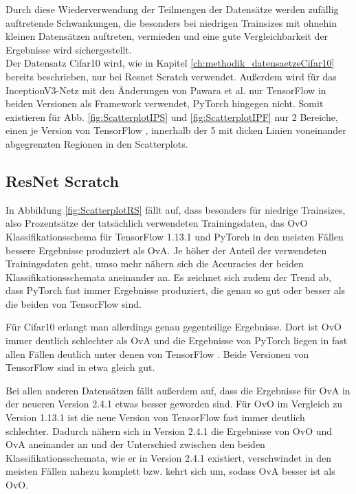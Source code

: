 Durch diese Wiederverwendung der Teilmengen der Datensätze werden zufällig auftretende Schwankungen, die besonders bei niedrigen Trainsizes mit ohnehin kleinen Datensätzen auftreten, vermieden und eine gute Vergleichbarkeit der Ergebnisse wird sichergestellt.\\

Der Datensatz Cifar10 \cite{cifar10} wird, wie in Kapitel \ref{ch:methodik_datensaetzeCifar10} bereits beschrieben, nur bei Resnet Scratch verwendet. Außerdem wird für das InceptionV3-Netz mit den Änderungen von Pawara et al. \cite{pawaraWebsiteCode} nur TensorFlow \cite{tensorflow} in beiden Versionen als Framework verwendet, PyTorch \cite{pytorch} hingegen nicht. Somit existieren für Abb. \ref{fig:ScatterplotIPS} und \ref{fig:ScatterplotIPF} nur 2 Bereiche, einen je Version von TensorFlow \cite{tensorflow}, innerhalb der 5 mit dicken Linien voneinander abgegrenzten Regionen in den Scatterplots.


\subsection{ResNet Scratch}
\label{ch:ergebnisseOvOOvA-RS}
In Abbildung \ref{fig:ScatterplotRS} fällt auf, dass besonders für niedrige Trainsizes, also Prozentsätze der tatsächlich verwendeten Trainingsdaten, das OvO Klassifikationsschema für TensorFlow \cite{tensorflow} 1.13.1 und PyTorch \cite{pytorch} in den meisten Fällen bessere Ergebnisse produziert als OvA. Je höher der Anteil der verwendeten Trainingsdaten geht, umso mehr nähern sich die Accuracies der beiden Klassifikationsschemata aneinander an. Es zeichnet sich zudem der Trend ab, dass PyTorch \cite{pytorch} fast immer Ergebnisse produziert, die genau so gut oder besser als die beiden von TensorFlow \cite{tensorflow} sind.


Für Cifar10 \cite{cifar10} erlangt man allerdings genau gegenteilige Ergebnisse. Dort ist OvO immer deutlich schlechter als OvA und die Ergebnisse von PyTorch \cite{pytorch} liegen in fast allen Fällen deutlich unter denen von TensorFlow \cite{tensorflow}. Beide Versionen von TensorFlow \cite{tensorflow} sind in etwa gleich gut.

Bei allen anderen Datensätzen fällt außerdem auf, dass die Ergebnisse für OvA in der neueren Version 2.4.1 etwas besser geworden sind. Für OvO im Vergleich zu Version 1.13.1 ist die neue Version von TensorFlow \cite{tensorflow} fast immer deutlich schlechter. Dadurch nähern sich in Version 2.4.1 die Ergebnisse von OvO und OvA aneinander an und der Unterschied zwischen den beiden Klassifikationsschemata, wie er in Version 2.4.1 existiert, verschwindet in den meisten Fällen nahezu komplett bzw. kehrt sich um, sodass OvA besser ist als OvO.

